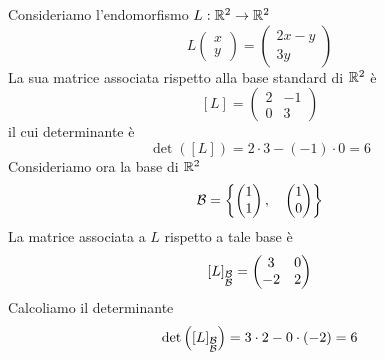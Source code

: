 \begin{example}
	Consideriamo l'endomorfismo $L : \mathbb{R}^2 \to \mathbb{R}^2$
	\[
		L \begin{pmatrix}
			x \\ y
		\end{pmatrix} =
		\begin{pmatrix}
			2x - y \\
			3y
		\end{pmatrix}
	\]
	La sua matrice associata rispetto alla base standard di $\mathbb{R}^2$ è
	\[
		[L] = \begin{pmatrix}
			2 & -1 \\
			0 & 3
		\end{pmatrix}
	\]
	il cui determinante è \[ \det([L]) = 2 \cdot 3 - (-1) \cdot 0 = 6 \]
	Consideriamo ora la base di $\mathbb{R}^2$
	\[
		\mathcal{B} =
		\left\{
		\begin{pmatrix} 1 \\ 1 \end{pmatrix}, \quad
		\begin{pmatrix} 1 \\ 0 \end{pmatrix}
		\right\}
	\]
	La matrice associata a $L$ rispetto a tale base è
	\[
		[L]_{\substack{\mathcal{B} \\ \mathcal{B}}} =
		\begin{pmatrix}
			3  & 0 \\
			-2 & 2
		\end{pmatrix}
	\]
	Calcoliamo il determinante
	\[
		\det \left( [L]_{\substack{\mathcal{B} \\ \mathcal{B}}} \right) =
		3 \cdot 2 - 0 \cdot (-2) = 6
	\]
\end{example}
